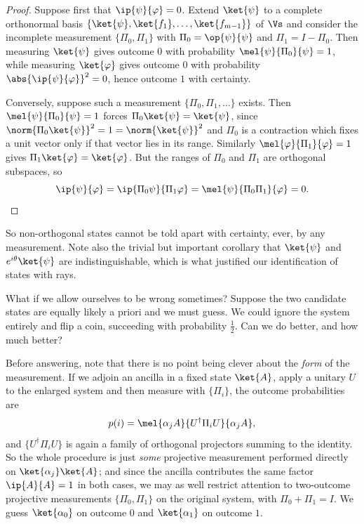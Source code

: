 \begin{proof}
	Suppose first that $\ip{\psi}{\varphi} = 0$. Extend $\ket{\psi}$ to a complete orthonormal basis $\{\ket{\psi}, \ket{f_1},\dots,\ket{f_{m-1}}\}$ of $\Vs$ and consider the incomplete measurement $\{\Pi_0, \Pi_1\}$ with $\Pi_0 = \op{\psi}{\psi}$ and $\Pi_1 = I - \Pi_0$. Then measuring $\ket{\psi}$ gives outcome $0$ with probability $\mel{\psi}{\Pi_0}{\psi} = 1$, while measuring $\ket{\varphi}$ gives outcome $0$ with probability $\abs{\ip{\psi}{\varphi}}^2 = 0$, hence outcome $1$ with certainty.

	Conversely, suppose such a measurement $\{\Pi_0, \Pi_1, \dots\}$ exists. Then $\mel{\psi}{\Pi_0}{\psi} = 1$ forces $\Pi_0\ket{\psi} = \ket{\psi}$, since $\norm{\Pi_0\ket{\psi}}^2 = 1 = \norm{\ket{\psi}}^2$ and $\Pi_0$ is a contraction which fixes a unit vector only if that vector lies in its range. Similarly $\mel{\varphi}{\Pi_1}{\varphi} = 1$ gives $\Pi_1\ket{\varphi} = \ket{\varphi}$. But the ranges of $\Pi_0$ and $\Pi_1$ are orthogonal subspaces, so
	$$\ip{\psi}{\varphi} = \ip{\Pi_0\psi}{\Pi_1\varphi} = \mel{\psi}{\Pi_0\Pi_1}{\varphi} = 0. \qedhere$$
\end{proof}

So non-orthogonal states cannot be told apart with certainty, ever, by any measurement. Note also the trivial but important corollary that $\ket{\psi}$ and $e^{i\theta}\ket{\psi}$ are indistinguishable, which is what justified our identification of states with rays.

What if we allow ourselves to be wrong sometimes? Suppose the two candidate states are equally likely a priori and we must guess. We could ignore the system entirely and flip a coin, succeeding with probability $\tfrac12$. Can we do better, and how much better?

Before answering, note that there is no point being clever about the \emph{form} of the measurement. If we adjoin an ancilla in a fixed state $\ket{A}$, apply a unitary $U$ to the enlarged system and then measure with $\{\Pi_i\}$, the outcome probabilities are
$$p(i) = \mel{\alpha_j A}{U^\dagger \Pi_i U}{\alpha_j A},$$
and $\{U^\dagger \Pi_i U\}$ is again a family of orthogonal projectors summing to the identity. So the whole procedure is just \emph{some} projective measurement performed directly on $\ket{\alpha_j}\ket{A}$; and since the ancilla contributes the same factor $\ip{A}{A} = 1$ in both cases, we may as well restrict attention to two-outcome projective measurements $\{\Pi_0,\Pi_1\}$ on the original system, with $\Pi_0 + \Pi_1 = I$. We guess $\ket{\alpha_0}$ on outcome $0$ and $\ket{\alpha_1}$ on outcome $1$.


